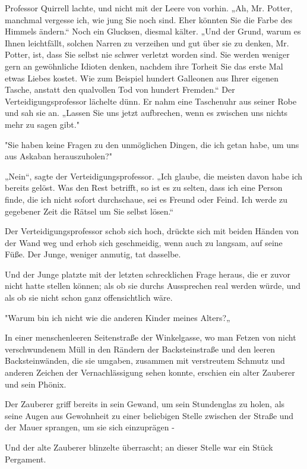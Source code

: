 {Professor Quirrell lachte, und nicht mit der Leere von vorhin. „Ah, Mr. Potter, manchmal vergesse ich, wie jung Sie noch sind. Eher könnten Sie die Farbe des Himmels ändern.“ Noch ein Glucksen, diesmal kälter. „Und der Grund, warum es Ihnen leichtfällt, solchen Narren zu verzeihen und gut über sie zu denken, Mr. Potter, ist, dass Sie selbst nie schwer verletzt worden sind. Sie werden weniger gern an gewöhnliche Idioten denken, nachdem ihre Torheit Sie das erste Mal etwas Liebes kostet. Wie zum Beispiel hundert Galleonen aus Ihrer eigenen Tasche, anstatt den qualvollen Tod von hundert Fremden.“ Der Verteidigungsprofessor lächelte dünn. Er nahm eine Taschenuhr aus seiner Robe und sah sie an. „Lassen Sie uns jetzt aufbrechen, wenn es zwischen uns nichts mehr zu sagen gibt."

"Sie haben keine Fragen zu den unmöglichen Dingen, die ich getan habe, um uns aus Askaban herauszuholen?"

„Nein“, sagte der Verteidigungsprofessor. „Ich glaube, die meisten davon habe ich bereits gelöst. Was den Rest betrifft, so ist es zu selten, dass ich eine Person finde, die ich nicht sofort durchschaue, sei es Freund oder Feind. Ich werde zu gegebener Zeit die Rätsel um Sie selbst lösen.“

Der Verteidigungsprofessor schob sich hoch, drückte sich mit beiden Händen von der Wand weg und erhob sich geschmeidig, wenn auch zu langsam, auf seine Füße. Der Junge, weniger anmutig, tat dasselbe.

Und der Junge platzte mit der letzten schrecklichen Frage heraus, die er zuvor nicht hatte stellen können; als ob sie durchs Aussprechen real werden würde, und als ob sie nicht schon ganz offensichtlich wäre.

"Warum bin ich nicht wie die anderen Kinder meines Alters?„

In einer menschenleeren Seitenstraße der Winkelgasse, wo man Fetzen von nicht verschwundenem Müll in den Rändern der Backsteinstraße und den leeren Backsteinwänden, die sie umgaben, zusammen mit verstreutem Schmutz und anderen Zeichen der Vernachlässigung sehen konnte, erschien ein alter Zauberer und sein Phönix.

Der Zauberer griff bereits in sein Gewand, um sein Stundenglas zu holen, als seine Augen aus Gewohnheit zu einer beliebigen Stelle zwischen der Straße und der Mauer sprangen, um sie sich einzuprägen -

Und der alte Zauberer blinzelte überrascht; an dieser Stelle war ein Stück Pergament.

}
